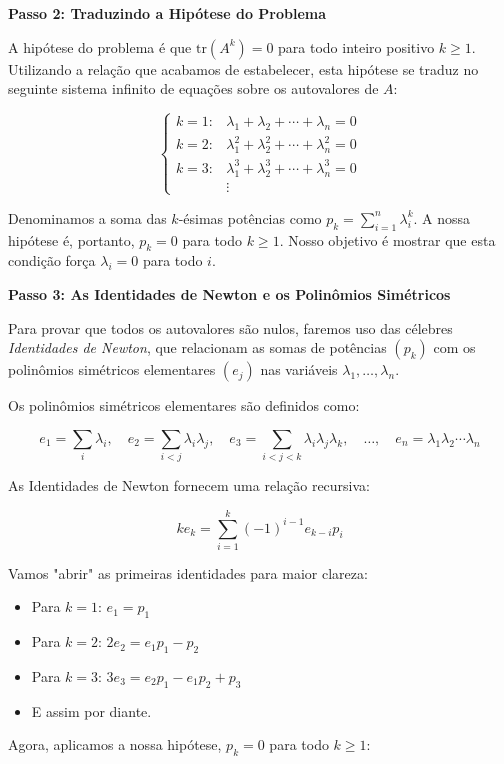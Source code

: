 \textbf{Passo 2: Traduzindo a Hipótese do Problema}

A hipótese do problema é que $\mathrm{tr}(A^k)=0$ para todo inteiro positivo $k \geq 1$. Utilizando a relação que
acabamos de estabelecer, esta hipótese se traduz no seguinte sistema infinito de equações sobre os
autovalores de $A$:

\[
\begin{cases}
k=1: & \lambda_1+\lambda_2+\cdots+\lambda_n=0 \\
k=2: & \lambda_1^2+\lambda_2^2+\cdots+\lambda_n^2=0 \\
k=3: & \lambda_1^3+\lambda_2^3+\cdots+\lambda_n^3=0 \\
\quad & \vdots
\end{cases}
\]

Denominamos a soma das $k$-ésimas potências como $p_k=\sum_{i=1}^n \lambda_i^k$. A nossa hipótese é, portanto,
$p_k=0$ para todo $k \geq 1$. Nosso objetivo é mostrar que esta condição força $\lambda_i=0$ para todo $i$.

\textbf{Passo 3: As Identidades de Newton e os Polinômios Simétricos}

Para provar que todos os autovalores são nulos, faremos uso das célebres \textit{Identidades de Newton},
que relacionam as somas de potências $(p_k)$ com os polinômios simétricos elementares $(e_j)$ nas
variáveis $\lambda_1,\ldots,\lambda_n$.

Os polinômios simétricos elementares são definidos como:

\[
e_1=\sum_i \lambda_i, \quad
e_2=\sum_{i<j} \lambda_i\lambda_j, \quad
e_3=\sum_{i<j<k} \lambda_i\lambda_j\lambda_k, \quad
\ldots, \quad
e_n=\lambda_1\lambda_2\cdots\lambda_n
\]

As Identidades de Newton fornecem uma relação recursiva:

\[
ke_k = \sum_{i=1}^k (-1)^{i-1} e_{k-i} p_i
\]

Vamos "abrir" as primeiras identidades para maior clareza:

\begin{itemize}
\item Para $k=1$: $e_1=p_1$
\item Para $k=2$: $2e_2=e_1p_1-p_2$
\item Para $k=3$: $3e_3=e_2p_1-e_1p_2+p_3$
\item E assim por diante.
\end{itemize}

Agora, aplicamos a nossa hipótese, $p_k=0$ para todo $k \geq 1$:

